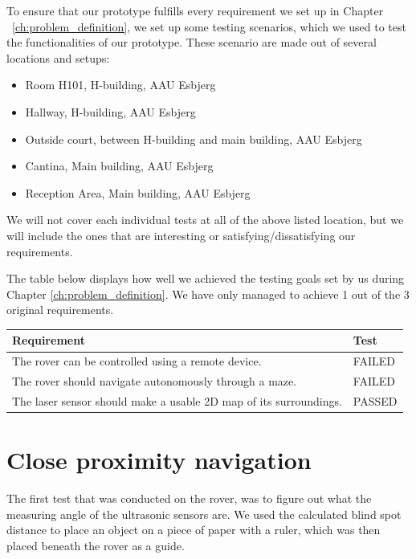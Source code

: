 To ensure that our prototype fulfills every requirement we set up in Chapter ~\ref{ch:problem_definition}, we set up some testing scenarios, which we used to test the functionalities of our prototype. These scenario are made out of several locations and setups:
\begin{itemize}
	\item Room H101, H-building, AAU Esbjerg
	\item Hallway, H-building, AAU Esbjerg
	\item Outside court, between H-building and main building, AAU Esbjerg
	\item Cantina, Main building, AAU Esbjerg
	\item Reception Area, Main building, AAU Esbjerg
\end{itemize}

We will not cover each individual tests at all of the above listed location, but we will include the ones that are interesting or satisfying/dissatisfying our requirements.

The table below displays how well we achieved the testing goals set by us during Chapter \ref{ch:problem_definition}. We have only managed to achieve 1 out of the 3 original requirements.

\begin{table}[H]
	\centering
	\begin{tabular}{|l|l|}
		\hline
		\textbf{Requirement} & \textbf{Test} \\ \hline
		The rover can be controlled using a remote device. & FAILED \\ \hline
		The rover should navigate autonomously through a maze. & FAILED \\ \hline
		The laser sensor should make a usable 2D map of its surroundings. & PASSED\\ \hline
	\end{tabular}
\end{table}

\clearpage
\section{Close proximity navigation}

The first test that was conducted on the rover, was to figure out what the measuring angle of the ultrasonic sensors are. We used the calculated blind spot distance to place an object on a piece of paper with a ruler, which was then placed beneath the rover as a guide.



